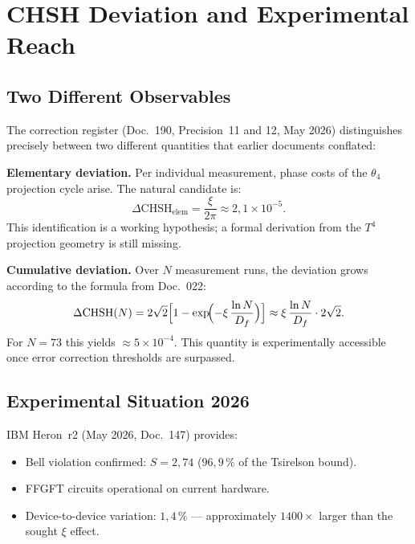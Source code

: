 \chapter{CHSH Deviation and Experimental Reach}
\label{ch:chsh_exp}

\section{Two Different Observables}

The correction register (Doc.~190, Precision~11 and 12, May 2026)
distinguishes precisely between two different quantities that earlier
documents conflated:

\textbf{Elementary deviation.} Per individual measurement,
phase costs of the $\theta_4$ projection cycle arise. The natural
candidate is:
\begin{equation}
  \Delta\mathrm{CHSH}_{\mathrm{elem}} = \frac{\xi}{2\pi}
  \approx 2{,}1\times10^{-5}.
\end{equation}
This identification is a working hypothesis; a formal derivation
from the $T^4$ projection geometry is still missing.

\textbf{Cumulative deviation.} Over $N$ measurement runs, the
deviation grows according to the formula from Doc.~022:
\begin{equation}
  \Delta\mathrm{CHSH}(N) = 2\sqrt2 \Bigl[1 - \exp\!\Bigl(-\xi\,\frac{\ln N}{D_f}\Bigr)\Bigr]
  \approx \xi\,\frac{\ln N}{D_f}\cdot2\sqrt2.
\end{equation}
For $N=73$ this yields $\approx5\times10^{-4}$. This quantity is
experimentally accessible once error correction thresholds are
surpassed.

\section{Experimental Situation 2026}

IBM Heron~r2 (May 2026, Doc.~147) provides:
\begin{itemize}
  \item Bell violation confirmed: $S=2{,}74$ ($96{,}9\,\%$ of the
        Tsirelson bound).
  \item FFGFT circuits operational on current hardware.
  \item Device-to-device variation: $1{,}4\,\%$ — approximately
        $1400\times$ larger than the sought $\xi$ effect.
\end{itemize}

